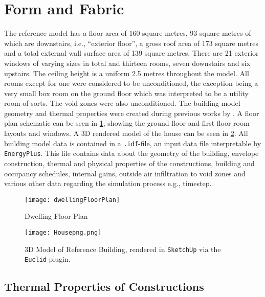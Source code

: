\section{Form and Fabric}
The reference model has a floor area of 160 square metres, 93 square metres of which are downstairs, i.e., ``exterior floor'', a gross roof area of 173 square metres and a total external wall surface area of 139 square metres. There are 21 exterior windows of varying sizes in total and thirteen rooms, seven downstairs and six upstairs. The ceiling height is a uniform 2.5 metres throughout the model. All rooms except for one were considered to be unconditioned, the exception being a very small box room on the ground floor which was interpreted to be a utility room of sorts. The void zones were also unconditioned. The building model geometry and thermal properties were created during previous works by \citeauthor{keogh_technical_2022}. A floor plan schematic can be seen in \cref{fig:floorplan}, showing the ground floor and first floor room layouts and windows. A 3D rendered model of the house can be seen in \cref{fig:3dmodel}. All building model data is contained in a \texttt{.idf}-file, an input data file interpretable by \texttt{EnergyPlus}. This file contains data about the geometry of the building, envelope construction, thermal and physical properties of the constructions, building and occupancy schedules, internal gains, outside air infiltration to void zones and various other data regarding the simulation process e.g., timestep. 

\begin{figure}[htb]
    \centering
    \texttt{[image: dwellingFloorPlan]}
    \caption{Dwelling Floor Plan}
    \label{fig:floorplan}
\end{figure}

\begin{figure}[htb]
    \centering
    \texttt{[image: Housepng.png]}
    \caption[3D Model of Reference Building]{3D Model of Reference Building, rendered in \texttt{SketchUp} via the \texttt{Euclid} plugin.}
    \label{fig:3dmodel}
\end{figure}


\subsection{Thermal Properties of Constructions}

